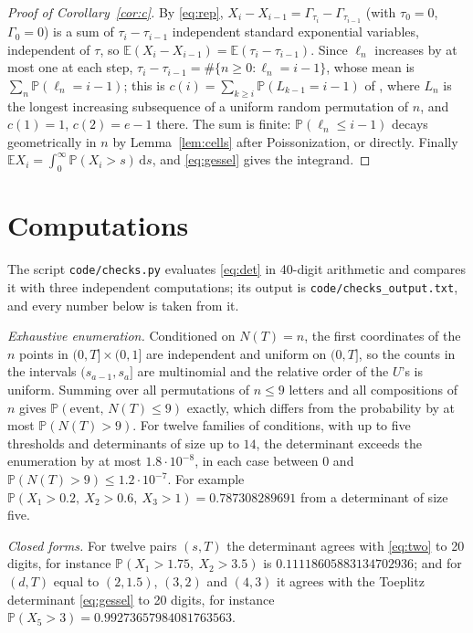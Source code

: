 \documentclass[11pt]{amsart}
\theoremstyle{remark}
\numberwithin{equation}{section}
\newcommand{\E}{\mathbb E}
\newcommand{\Pp}{\mathbb P}
\newcommand{\dd}{\,\mathrm d}
\begin{document}
\begin{proof}[Proof of Corollary~\ref{cor:c}]
By \eqref{eq:rep}, $X_i-X_{i-1}=\Gamma_{\tau_i}-\Gamma_{\tau_{i-1}}$ (with $\tau_0=0$, $\Gamma_0=0$) is a sum of $\tau_i-\tau_{i-1}$ independent standard exponential variables, independent of $\tau$, so $\E(X_i-X_{i-1})=\E(\tau_i-\tau_{i-1})$. Since $\ell_n$ increases by at most one at each step, $\tau_i-\tau_{i-1}=\#\{n\ge0:\ell_n=i-1\}$, whose mean is $\sum_n\Pp(\ell_n=i-1)$; this is $c(i)=\sum_{k\ge i}\Pp(L_{k-1}=i-1)$ of \cite[Proposition~9]{AD99}, where $L_n$ is the longest increasing subsequence of a uniform random permutation of $n$, and $c(1)=1$, $c(2)=e-1$ there. The sum is finite: $\Pp(\ell_n\le i-1)$ decays geometrically in $n$ by Lemma~\ref{lem:cells} after Poissonization, or directly. Finally $\E X_i=\int_0^\infty\Pp(X_i>s)\dd s$, and \eqref{eq:gessel} gives the integrand.
\end{proof}

\section{Computations}\label{sec:comp}

The script \texttt{code/checks.py} evaluates \eqref{eq:det} in 40-digit arithmetic and compares it with three independent computations; its output is \texttt{code/checks\_output.txt}, and every number below is taken from it.

\emph{Exhaustive enumeration.} Conditioned on $N(T)=n$, the first coordinates of the $n$ points in $(0,T]\times(0,1]$ are independent and uniform on $(0,T]$, so the counts in the intervals $(s_{a-1},s_a]$ are multinomial and the relative order of the $U$'s is uniform. Summing over all permutations of $n\le9$ letters and all compositions of $n$ gives $\Pp(\text{event},\,N(T)\le9)$ exactly, which differs from the probability by at most $\Pp(N(T)>9)$. For twelve families of conditions, with up to five thresholds and determinants of size up to $14$, the determinant exceeds the enumeration by at most $1.8\cdot10^{-8}$, in each case between $0$ and $\Pp(N(T)>9)\le1.2\cdot10^{-7}$. For example $\Pp(X_1>0.2,\ X_2>0.6,\ X_3>1)=0.787308289691$ from a determinant of size five.

\emph{Closed forms.} For twelve pairs $(s,T)$ the determinant agrees with \eqref{eq:two} to 20 digits, for instance $\Pp(X_1>1.75,\ X_2>3.5)$ is
$0.11118605883134702936$; and for $(d,T)$ equal to $(2,1.5)$, $(3,2)$ and $(4,3)$ it agrees with the Toeplitz determinant \eqref{eq:gessel} to 20 digits, for instance $\Pp(X_5>3)=0.99273657984081763563$.
\end{document}
